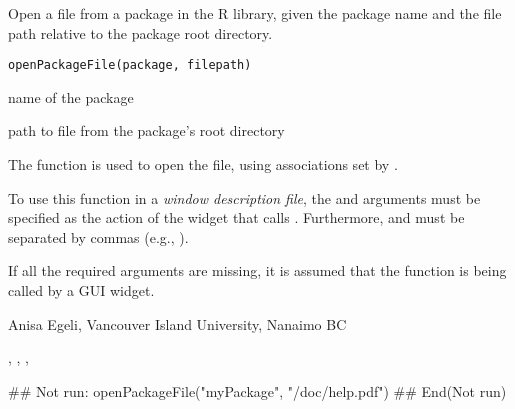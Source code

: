 \documentclass[letterpaper]{book}
\begin{document}
\begin{Description}\relax
Open a file from a package in the R library, given the package 
name and the file path relative to the package root directory.
\end{Description}
\begin{Usage}
\begin{verbatim}
openPackageFile(package, filepath)
\end{verbatim}
\end{Usage}
\begin{Arguments}
\begin{ldescription}
\item[\code{package}] name of the package
\item[\code{filepath}] path to file from the package's root directory
\end{ldescription}
\end{Arguments}
\begin{Details}\relax
The  function is used to open the file, using 
associations set by .

To use this function in a \emph{window description file}, the 
 and  arguments must be specified 
as the action of the widget that calls . 
Furthermore,  and  must be 
separated by commas (e.g., ).
\end{Details}
\begin{Note}\relax
If all the required arguments are missing, it is assumed that 
the function is being called by a GUI widget.
\end{Note}
\begin{Author}\relax
Anisa Egeli, Vancouver Island University, Nanaimo BC
\end{Author}
\begin{SeeAlso}\relax
{}, , ,
\end{SeeAlso}
\begin{Examples}
\begin{ExampleCode}
## Not run: 
openPackageFile("myPackage", "/doc/help.pdf")
## End(Not run)
\end{ExampleCode}
\end{Examples}
\end{document}
